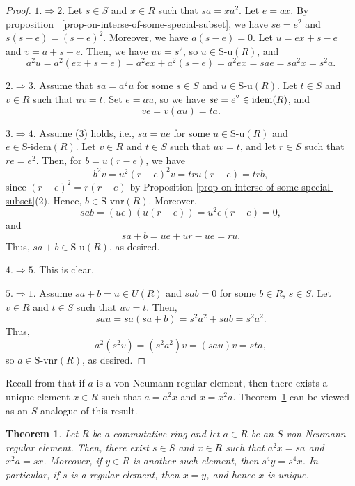 \documentclass[12pt]{article}
\newtheorem{thm}{\bf Theorem}[section]
\def\Sidem{\mathrm{S\text{-}idem}}
\def\Su{\mathrm{S\text{-}u}}
\def\Svnr{\mathrm{S\text{-}vnr}}
\def\idem{{\rm idem}}
\begin{document}
\begin{proof}
\(1.  \Rightarrow  2.\) Let \( s \in S \) and \( x \in R \) such that \( sa = xa^2 \). Let \( e = ax \). By proposition \ \ref{prop-on-interse-of-some-special-subset}, we have \( se = e^2 \) and \( s(s-e) = (s-e)^2 \). Moreover, we have \( a(s - e) = 0 \). Let \( u = ex + s - e \) and \( v = a + s - e \). Then, we have \( uv = s^2 \), so \( u \in \Su(R) \), and
\[
a^2u = a^2(ex + s - e) = a^2ex + a^2(s - e) = a^2ex = sae = sa^2x = s^2a.
\]

\(2. \Rightarrow  3.\) 
Assume that \( sa = a^2u \) for some \( s \in S \) and \( u \in \Su(R) \). Let \( t \in S \) and \( v \in R \) such that \( uv = t \). Set \( e = au \), so we have \( se = e^2 \in \idem(R) \), and
\[
ve = v(au) = t a.
\]

 \(3. \Rightarrow  4.\)
Assume (3) holds, i.e., \( sa = ue \) for some \( u \in \Su(R) \) and \( e \in \Sidem(R) \). Let \( v \in R \) and \( t \in S \) such that \( uv = t \), and let \( r \in S \) such that \( re = e^2 \). Then, for \( b = u(r - e) \), we have
\[
b^2v = u^2(r - e)^2v = tru(r - e) = trb,
\]
since \( (r - e)^2 = r(r - e) \) by Proposition \ref{prop-on-interse-of-some-special-subset}(2). Hence, \( b \in \Svnr(R) \). Moreover,
\[
sab = (ue)(u(r - e)) = u^2e(r - e) = 0,
\]
and
\[
sa + b = ue + ur - ue = ru.
\]
Thus, \( sa + b \in \Su(R) \), as desired.

 \(4. \Rightarrow 5.\) 
This is clear.

\(5. \Rightarrow 1.\) Assume \( sa + b = u \in U(R) \) and \( sab = 0 \) for some \( b \in R \), \( s \in S \). Let \( v \in R \) and \( t \in S \) such that \( uv = t \). Then,
\[
sau = sa(sa + b) = s^2a^2 + sab = s^2a^2.
\]
Thus, 
\[
a^2(s^2v) = (s^2a^2)v = (sau)v = sta,
\]
so \( a \in \Svnr(R) \), as desired.
\end{proof} 
  
Recall from \cite[Lemma~4]{Rap1} that if \( a \) is a von Neumann regular element, then there exists a unique element \( x \in R \) such that \( a = a^{2}x \) and \( x = x^{2}a \). Theorem~\ref{thm-S-von-regualr-unique-decompostion} can be viewed as an \( S \)-analogue of this result.

   \begin{thm}\label{thm-S-von-regualr-unique-decompostion}
Let \( R \) be a commutative ring and let \( a \in R \) be an \( S \)-von Neumann regular element. Then, there exist \( s \in S \) and \( x \in R \) such that \( a^2x = sa \) and \( x^2a = sx \). Moreover, if \( y \in R \) is another such element, then \( s^4y = s^4x \). In particular, if \( s \) is a regular element, then \( x = y \), and hence \( x \) is unique.
\end{thm}
\end{document}
